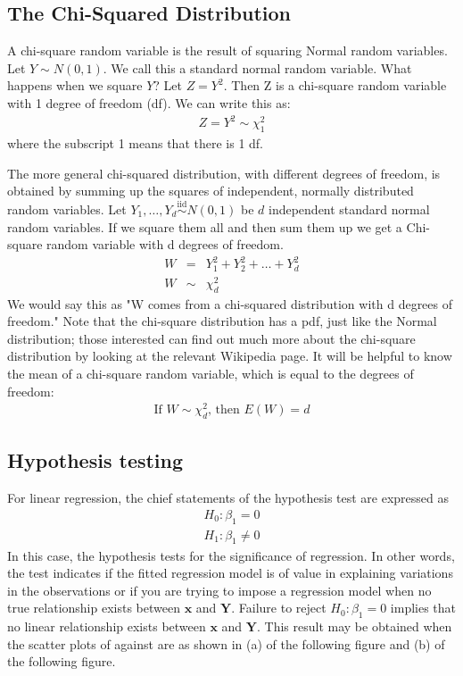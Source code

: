 \documentclass[11pt]{article}
\theoremstyle{remark}
\begin{document}
\pagebreak
\subsection{The Chi-Squared Distribution}\label{SectionChiSquare}
A chi-square random variable is the result of squaring Normal random variables.  Let $Y\sim N(0,1)$. We call this a standard normal random variable. What happens when we square $Y$?  Let $Z=Y^2$.  Then Z is a chi-square random variable with 1 degree of freedom (df).  We can write this as:
\begin{eqnarray}
Z=Y^2 \sim \chi_1^2
\end{eqnarray}
where the subscript 1 means that there is 1 df.

The more general chi-squared distribution, with different degrees of freedom, is obtained by summing up the squares of independent, normally distributed random variables.
Let $Y_1,\hdots,Y_d\overset{\mathrm{iid}}{\sim}N(0,1)$ be $d$ independent standard normal random variables. If we square them all and then sum them up we get a Chi-square random variable with d degrees of freedom.
\begin{eqnarray}
W&=&Y_1^2+Y_2^2+\hdots+Y_d^2\nonumber\\
W&\sim&\chi_d^2
\end{eqnarray}
We would say this as "W comes from a chi-squared distribution with d degrees of freedom."  Note that the chi-square distribution has a pdf, just like the Normal distribution; those interested can find out much more about the chi-square distribution by looking at the relevant Wikipedia page.  It will be helpful to know the mean of a chi-square random variable, which is equal to the degrees of freedom:
\begin{eqnarray}
\text{If $W\sim\chi_d^2$, then $E(W)=d$}
\end{eqnarray}

\pagebreak
\subsection{Hypothesis testing}
For linear regression, the chief statements of the hypothesis test are expressed as
\begin{eqnarray}
H_0: \beta_1 = 0\nonumber\\
H_1: \beta_1 \ne 0
\end{eqnarray}
In this case, the hypothesis tests for the significance of regression. In other words, the test indicates if the fitted regression model is of value in explaining variations in the observations or if you are trying to impose a regression model when no true relationship exists between $\mathbf{x}$ and $\mathbf{Y}$. Failure to reject $H_0: \beta_1 = 0$ implies that no linear relationship exists between $\mathbf{x}$ and $\mathbf{Y}$. This result may be obtained when the scatter plots of against are as shown in (a) of the following figure and (b) of the following figure.
\end{document}
